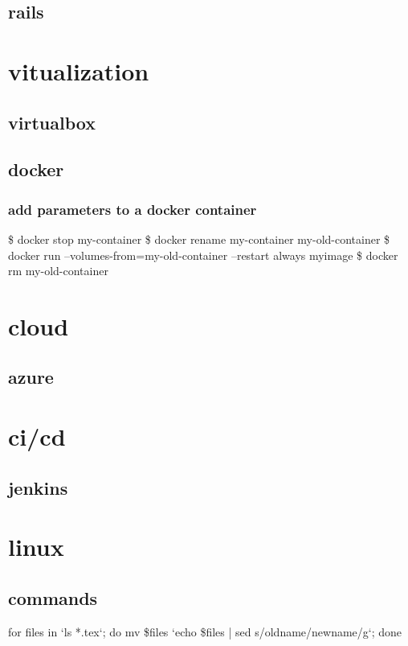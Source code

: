 \documentclass{report}
\begin{document}
\section{rails}

\chapter{vitualization}
\section{virtualbox}
\section{docker}
\subsection{add parameters to a docker container}
\begin{displayquote}
\$ docker stop my-container \newline
\$ docker rename my-container my-old-container \newline
\$ docker run --volumes-from=my-old-container --restart always myimage \newline
\$ docker rm my-old-container
\end{displayquote}

\chapter{cloud}
\section{azure}

\chapter{ci/cd}
\section{jenkins}

\chapter{linux}
\section{commands}
for files in `ls *.tex`; do mv \$files `echo \$files | sed s/oldname/newname/g`; done
\end{document}
